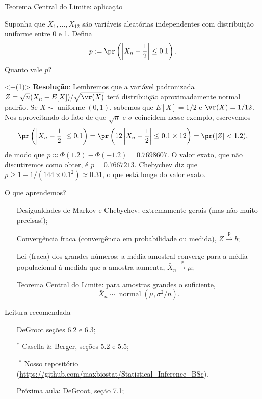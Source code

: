\begin{frame}{Teorema Central do Limite: aplicação}
\begin{pergunta}
Suponha que $X_1, \ldots, X_{12}$ são variáveis aleatórias independentes com distribuição uniforme entre 0 e 1.
Defina
$$  p:=  \pr\left(\left| \bar{X}_n - \frac{1}{2}\right| \leq 0.1\right).$$
Quanto vale $p$?
\end{pergunta}
\uncover<+(1)>{
\textbf{Resolução}: 
Lembremos que a variável padronizada $Z = \sqrt{n}(\bar{X}_n-E[X])/\sqrt{\vr(X)}$ terá distribuição aproximadamente normal padrão.
Se $X\sim \operatorname{uniforme}(0, 1)$, sabemos que $E[X] = 1/2$ e $\vr(X) = 1/12$.
Nos aproveitando do fato de que $\sqrt{n}$ e $\sigma$ coincidem nesse exemplo, escrevemos
$$\pr\left(\left| \bar{X}_n - \frac{1}{2}\right| \leq 0.1\right) =  \pr\left(12\left| \bar{X}_n - \frac{1}{2}\right| \leq 0.1\times 12\right) = \pr(|Z| < 1.2),$$
de modo que $p \approx \Phi(1.2)-\Phi(-1.2) = 0.7698607$.
O valor exato, que não discutiremos como obter, é $p = 0.7667213$.
Chebychev diz que $p \geq 1 - 1/(144 \times 0.1^2) \approx 0.31$, o que está longe do valor exato.
}
\end{frame}
\begin{frame}{O que aprendemos?}
\begin{itemize}
\item[\faLightbulbO] Desigualdades de Markov e Chebychev: extremamente gerais (mas não muito precisas!);
\item[\faLightbulbO] Convergência fraca (convergência em probabilidade ou medida), $Z \xrightarrow{\text{p}} b$;
\item[\faLightbulbO] Lei (fraca) dos grandes números: a média amostral converge para a média populacional à medida que a amostra aumenta, $\bar{X}_n \xrightarrow{\text{p}} \mu$;
\item[\faLightbulbO] Teorema Central do Limite: para amostras grandes o suficiente, 
$$\bar{X}_n \sim \operatorname{normal}(\mu, \sigma^2/n).$$
\end{itemize} 
\end{frame}
\begin{frame}{Leitura recomendada}
\begin{itemize}
 \item[\faBook] DeGroot seções 6.2 e 6.3;
 \item[\faBook] $^\ast$ Casella \& Berger, seções 5.2 e 5.5;
 \item[\faGithub] $^\ast$ Nosso repositório (\url{https://github.com/maxbiostat/Statistical_Inference_BSc}).
  \item[\faForward] Próxima aula: DeGroot, seção 7.1;
  \end{itemize} 
\end{frame}
